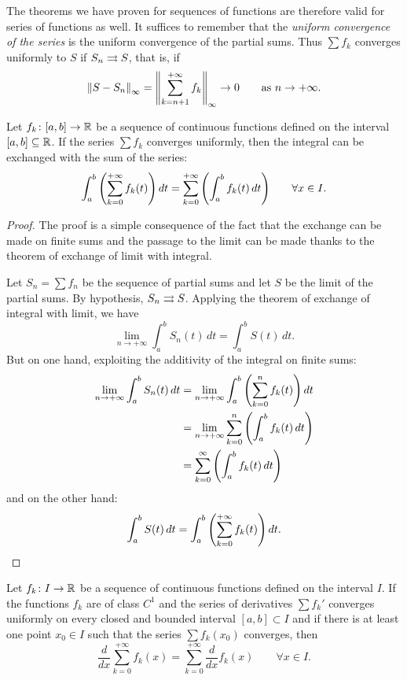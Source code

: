 The theorems we have proven for sequences of functions are therefore valid for
series of functions as well. It suffices to remember that the \emph{uniform
convergence of the series}%
%
%
%
  is the uniform convergence of the partial sums. Thus $\sum f_k$ converges
 uniformly to $S$ if $S_n \rightrightarrows S$, that is, if
\[
  {\left\Vert S - S_n\right\Vert}_\infty = {\left\Vert \sum_{k=n+1}^{+\infty} f_k\right\Vert}_\infty \to 0
  \qquad \text{as $n\to +\infty$.}
\]

\begin{theorem}
\label{th:integrale_serie}
\mymark{**}%
%
%
%
%
Let $f_k\colon [a,b]\to{\mathbb R}$ be a sequence of continuous functions defined on the
interval $[a,b]\subseteq {\mathbb R}$. If the series $\sum f_k$ converges uniformly, then
the integral can be exchanged with the sum of the series:
\[
  \int_a^b {\left( \sum_{k=0}^{+\infty} f_k(t) \right)}\, dt
  = \sum_{k=0}^{+\infty} {\left( \int_a^b f_k(t)\, dt \right)}
  \qquad \forall x \in I.
\]
\end{theorem}
\begin{proof}
\mymark{**}
The proof is a simple consequence of the fact that the exchange can be made on
finite sums and the passage to the limit can be made thanks to the theorem of
exchange of limit with integral.

Let $S_n = \sum f_n$ be the sequence of partial sums and let $S$ be the limit of
the partial sums. By hypothesis, $S_n\rightrightarrows S$. Applying the theorem of exchange of
integral with limit, we have
\[
  \lim_{n\to +\infty} \int_a^b S_n(t)\, dt = \int_a^b S(t)\, dt.
\]
But on one hand, exploiting the additivity of the integral on finite sums:
\begin{align*}
  \lim_{n\to +\infty} \int_a^b S_n(t)\, dt
   &= \lim_{n\to+\infty}\int_a^b {\left( \sum_{k=0}^n f_k(t) \right)} \,  dt\\
   &= \lim_{n\to+\infty}\sum_{k=0}^n {\left( \int_a^b f_k(t)\, dt \right)}\\
   &= \sum_{k=0}^\infty {\left( \int_a^b f_k(t)\, dt \right)}
\end{align*}
and on the other hand:
\[
  \int_a^b S(t)\, dt = \int_a^b {\left( \sum_{k=0}^{+\infty} f_k(t) \right)}\, dt.
\]
\end{proof}

\begin{theorem}
\mymark{**}
Let $f_k\colon I\to{\mathbb R}$ be a sequence of continuous functions defined on the
interval $I$. If the functions $f_k$ are of class $C^1$ and the series of
derivatives $\sum f_k'$ converges uniformly on every closed and bounded interval
$[a,b]\subset I$ and if there is at least one point $x_0\in I$ such that the
series $\sum f_k(x_0)$ converges, then
\[
  \frac{d}{dx} \sum_{k=0}^{+\infty} f_k(x) = \sum_{k=0}^{+\infty} \frac{d}{dx}f_k(x)
  \qquad \forall x \in I.
\]
\end{theorem}

